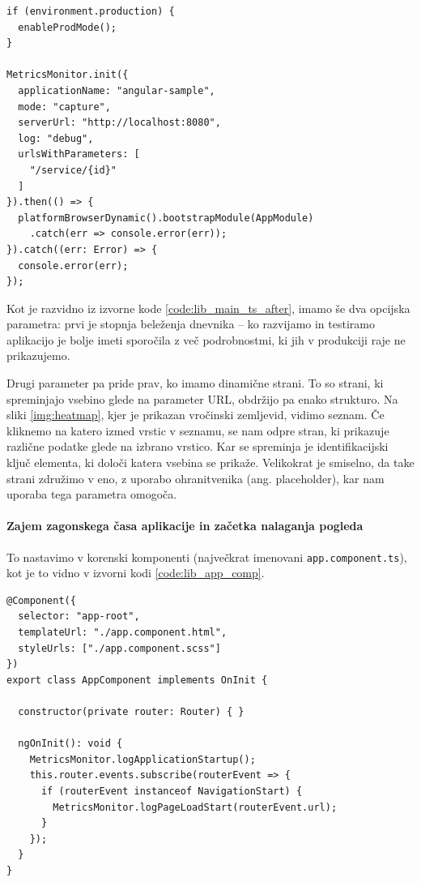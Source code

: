 \documentclass[a4paper, 12pt]{book}
\begin{document}
\begin{lstlisting}[label=code:lib_main_ts_after, caption=Inicializacija knjižnice]
if (environment.production) {
  enableProdMode();
}

MetricsMonitor.init({
  applicationName: "angular-sample",
  mode: "capture",
  serverUrl: "http://localhost:8080",
  log: "debug",
  urlsWithParameters: [
    "/service/{id}"
  ]
}).then(() => {
  platformBrowserDynamic().bootstrapModule(AppModule)
    .catch(err => console.error(err));
}).catch((err: Error) => {
  console.error(err);
});
\end{lstlisting}

Kot je razvidno iz izvorne kode \ref{code:lib_main_ts_after}, imamo še dva opcijska parametra: prvi je stopnja beleženja dnevnika -- ko razvijamo in testiramo aplikacijo je bolje imeti sporočila z več podrobnostmi, ki jih v produkciji raje ne prikazujemo.

Drugi parameter pa pride prav, ko imamo dinamične strani. To so strani, ki spreminjajo vsebino glede na parameter URL, obdržijo pa enako strukturo. Na sliki \ref{img:heatmap}, kjer je prikazan vročinski zemljevid, vidimo seznam. Če kliknemo na katero izmed vrstic v seznamu, se nam odpre stran, ki prikazuje različne podatke glede na izbrano vrstico. Kar se spreminja je identifikacijski ključ elementa, ki določi katera vsebina se prikaže. Velikokrat je smiselno, da take strani združimo v eno, z uporabo ohranitvenika (ang. placeholder), kar nam uporaba tega parametra omogoča.

\paragraph{Zajem zagonskega časa aplikacije in začetka nalaganja pogleda}

To nastavimo v korenski komponenti (največkrat imenovani \verb|app.component.ts|), kot je to vidno v izvorni kodi \ref{code:lib_app_comp}.

\begin{lstlisting}[label=code:lib_app_comp, caption=Zajem zagonskega časa aplikacije in začetka nalaganja pogleda]
@Component({
  selector: "app-root",
  templateUrl: "./app.component.html",
  styleUrls: ["./app.component.scss"]
})
export class AppComponent implements OnInit {

  constructor(private router: Router) { }

  ngOnInit(): void {
    MetricsMonitor.logApplicationStartup();
    this.router.events.subscribe(routerEvent => {
      if (routerEvent instanceof NavigationStart) {
        MetricsMonitor.logPageLoadStart(routerEvent.url);
      }
    });
  }
}
\end{lstlisting}
\end{document}
